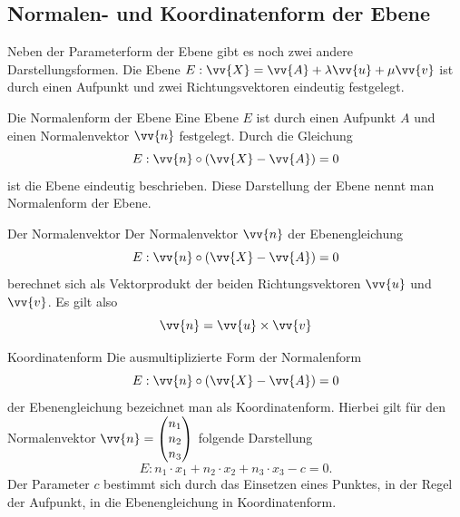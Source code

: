     \subsection{Normalen- und Koordinatenform der Ebene}
    Neben der Parameterform der Ebene gibt es noch zwei andere Darstellungsformen.  Die Ebene \(E:\vv{X} = \vv{A} + \lambda \vv{u} + \mu\vv{v}\) ist durch einen Aufpunkt und zwei Richtungsvektoren eindeutig festgelegt.  
    \begin{defi}{Die Normalenform der Ebene}{}
Eine Ebene \(E\) ist durch einen Aufpunkt \(A\) und einen Normalenvektor \(\vv{n}\) festgelegt. Durch die Gleichung \[E: \vv{n}\circ\left( \vv{X} - \vv{A}\right) =0\] ist die Ebene eindeutig beschrieben. Diese Darstellung der Ebene nennt man Normalenform der Ebene.      
    \end{defi}
\begin{merke}{Der Normalenvektor}{}
Der Normalenvektor \(\vv{n}\) der Ebenengleichung    \[E: \vv{n}\circ\left( \vv{X} - \vv{A}\right) =0\] berechnet sich als Vektorprodukt der beiden Richtungsvektoren \(\vv{u}\) und \(\vv{v}\). Es gilt also \[\vv{n} = \vv{u} \times \vv{v}\] 
\end{merke}
\begin{merke}{Koordinatenform}{}
    Die ausmultiplizierte Form der Normalenform \[E: \vv{n}\circ\left( \vv{X} - \vv{A}\right) =0\] der Ebenengleichung bezeichnet man als Koordinatenform. Hierbei gilt für den Normalenvektor \(\vv{n} = \begin{pmatrix}
          n_1\\n_2\\n_3\end{pmatrix}\) folgende Darstellung \[E: n_1\cdot x_1 + n_2\cdot x_2 + n_3 \cdot x_3 -c = 0.\] Der Parameter \(c\) bestimmt sich durch das Einsetzen eines Punktes, in der Regel der Aufpunkt, in die Ebenengleichung in Koordinatenform. 
\end{merke}
